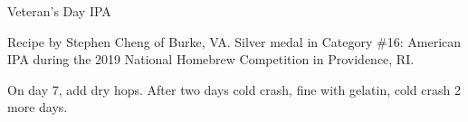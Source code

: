 \begin{recipe}{Veteran's Day IPA}

\begin{aboutblock}
Recipe by Stephen Cheng of Burke, VA. Silver medal in Category \#16: American
IPA during the 2019 National Homebrew Competition in Providence, RI.
\sourceaha
\end{aboutblock}


\begin{methodandtiming}
 
\begin{mashsteps}
\end{mashsteps}

\begin{fermentationsteps}
\end{fermentationsteps}

\begin{directions}
On day 7, add dry hops. After two days cold crash, fine with gelatin, cold crash 2
more days.
\end{directions}

\end{methodandtiming}

\recipebreak

\begin{ingredientsblock}

\begin{malts}
\end{malts}

\begin{hops}
\end{hops}


\end{ingredientsblock}

\end{recipe}

